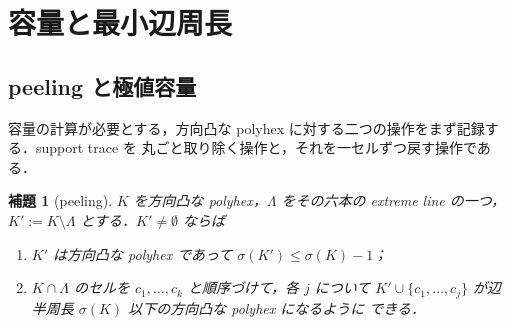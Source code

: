 \documentclass[11pt]{article}
\theoremstyle{plain}
\newtheorem{lemma}[theorem]{補題}
\theoremstyle{definition}
\theoremstyle{remark}
\newcommand{\sm}{\setminus}
\begin{document}
\section{容量と最小辺周長}\label{sec:capacity}

\subsection{peeling と極値容量}\label{sec:2.6}

容量の計算が必要とする，方向凸な polyhex に対する二つの操作をまず記録する．support trace を
丸ごと取り除く操作と，それを一セルずつ戻す操作である．

\begin{lemma}[peeling]\label{lem:peel}
\(K\) を方向凸な polyhex，\(\Lambda\) をその六本の extreme line の一つ，
\(K':=K\sm\Lambda\) とする．\(K'\neq\emptyset\) ならば
\begin{enumerate}
\item[(i)] \(K'\) は方向凸な polyhex であって \(\sigma(K')\le\sigma(K)-1\)；
\item[(ii)] \(K\cap\Lambda\) のセルを \(c_{1},\dots,c_{k}\) と順序づけて，各 \(j\) について
\(K'\cup\{c_{1},\dots,c_{j}\}\) が辺半周長 \(\sigma(K)\) 以下の方向凸な polyhex になるように
できる．
\end{enumerate}
\end{lemma}
\end{document}
